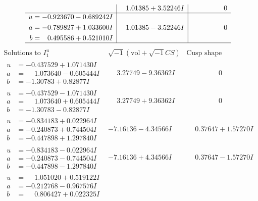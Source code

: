 \documentclass[1p]{elsarticle_modified}
\theoremstyle{definition}
\newcommand{\I}{\sqrt{-1}}
\begin{document}
$$\begin{array}{c|c|c}
 & \phantom{-}1.01385 + 3.52246 I & \phantom{-0.000000 } 0 \\ \hline\begin{aligned}
u &= -0.923670 - 0.689242 I \\
a &= -0.789827 + 1.033600 I \\
b &= \phantom{-}0.495586 + 0.521010 I\end{aligned}
 & \phantom{-}1.01385 - 3.52246 I & \phantom{-0.000000 } 0\\
 \hline 
 \end{array}$$\newpage$$\begin{array}{c|c|c}  
\text{Solutions to }I^u_{1}& \I (\text{vol} + \sqrt{-1}CS) & \text{Cusp shape}\\
 \hline 
\begin{aligned}
u &= -0.437529 + 1.071430 I \\
a &= \phantom{-}1.073640 - 0.605444 I \\
b &= -1.30783 + 0.82877 I\end{aligned}
 & \phantom{-}3.27749 - 9.36362 I & \phantom{-0.000000 } 0 \\ \hline\begin{aligned}
u &= -0.437529 - 1.071430 I \\
a &= \phantom{-}1.073640 + 0.605444 I \\
b &= -1.30783 - 0.82877 I\end{aligned}
 & \phantom{-}3.27749 + 9.36362 I & \phantom{-0.000000 } 0 \\ \hline\begin{aligned}
u &= -0.834183 + 0.022964 I \\
a &= -0.240873 + 0.744504 I \\
b &= -0.447898 + 1.297840 I\end{aligned}
 & -7.16136 - 4.34566 I & \phantom{-}0.37647 + 1.57270 I \\ \hline\begin{aligned}
u &= -0.834183 - 0.022964 I \\
a &= -0.240873 - 0.744504 I \\
b &= -0.447898 - 1.297840 I\end{aligned}
 & -7.16136 + 4.34566 I & \phantom{-}0.37647 - 1.57270 I \\ \hline\begin{aligned}
u &= \phantom{-}1.051020 + 0.519122 I \\
a &= -0.212768 - 0.967576 I \\
b &= \phantom{-}0.806427 + 0.022325 I\end{aligned}

\end{array}$$
\end{document}
